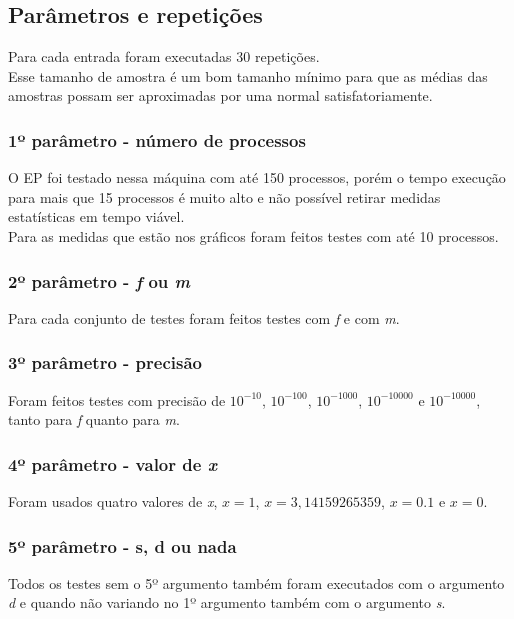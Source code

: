 \documentclass[paper=a4, fontsize=11pt]{scrartcl}
\numberwithin{equation}{section}		%
\numberwithin{figure}{section}			%
\numberwithin{table}{section}				%
\begin{document}
\subsection{Parâmetros e repetições}
Para cada entrada foram executadas 30 repetições.\\
Esse tamanho de amostra é um bom tamanho mínimo para que as médias das amostras possam ser aproximadas por uma normal satisfatoriamente.

\subsubsection{1º parâmetro - número de processos}
O EP foi testado nessa máquina com até 150 processos, porém o tempo execução para mais que 15 processos é muito alto e não possível retirar medidas estatísticas em tempo viável.\\
Para as medidas que estão nos gráficos foram feitos testes com até 10 processos.\\

\subsubsection{2º parâmetro - \textit{f} ou \textit{m}}
Para cada conjunto de testes foram feitos testes com \textit{f} e com \textit{m}.\\

\subsubsection{3º parâmetro - precisão}
Foram feitos testes com precisão de $10^{-10}$, $10^{-100}$, $10^{-1000}$, $10^{-10000}$ e $10^{-10000}$, tanto para \textit{f} quanto para \textit{m}.\\

\subsubsection{4º parâmetro - valor de \textit{x}}
Foram usados quatro valores de \textit{x}, $x=1$, $x=3,14159265359$, $x=0.1$ e $x=0$.\\

\subsubsection{5º parâmetro - s, d ou nada}
Todos os testes sem o 5º argumento também foram executados com o argumento \textit{d} e quando não variando no 1º argumento também com o argumento \textit{s}.\\
\end{document}
